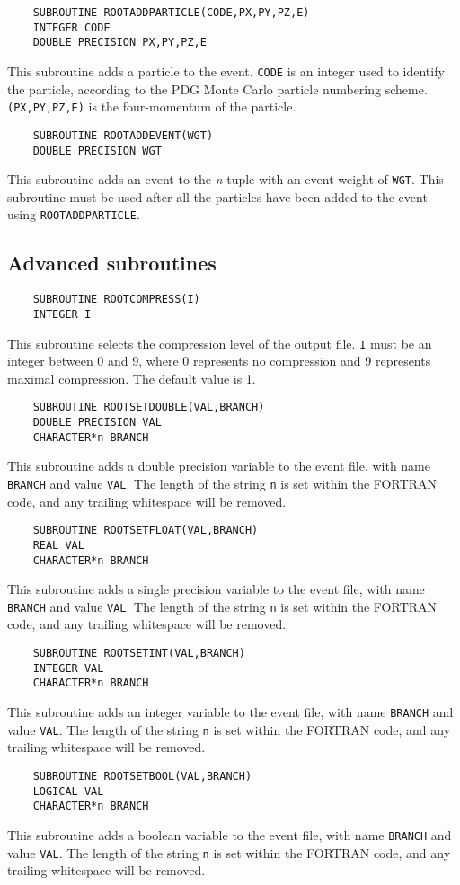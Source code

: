 \documentclass[a4paper,12pt]{article}
\begin{document}
\begin{verbatim}
    SUBROUTINE ROOTADDPARTICLE(CODE,PX,PY,PZ,E)
    INTEGER CODE
    DOUBLE PRECISION PX,PY,PZ,E\end{verbatim}
This subroutine adds a particle to the event. \verb|CODE| is an integer used to identify the particle, according to the PDG Monte Carlo particle numbering scheme. \verb|(PX,PY,PZ,E)| is the four-momentum of the particle.

\begin{verbatim}
    SUBROUTINE ROOTADDEVENT(WGT)
    DOUBLE PRECISION WGT\end{verbatim}
This subroutine adds an event to the \emph{n}-tuple with an event weight of \verb|WGT|. This subroutine must be used after all the particles have been added to the event using \verb|ROOTADDPARTICLE|.

\subsection{Advanced subroutines}
\begin{verbatim}
    SUBROUTINE ROOTCOMPRESS(I)
    INTEGER I\end{verbatim}
This subroutine selects the compression level of the output file. \verb|I| must be an integer between 0 and 9, where 0 represents no compression and 9 represents maximal compression. The default value is 1.

\begin{verbatim}
    SUBROUTINE ROOTSETDOUBLE(VAL,BRANCH)
    DOUBLE PRECISION VAL
    CHARACTER*n BRANCH\end{verbatim}
This subroutine adds a double precision variable to the event file, with name \verb|BRANCH| and value \verb|VAL|. The length of the string \verb|n| is set within the FORTRAN code, and any trailing whitespace will be removed.

\begin{verbatim}
    SUBROUTINE ROOTSETFLOAT(VAL,BRANCH)
    REAL VAL
    CHARACTER*n BRANCH\end{verbatim}
This subroutine adds a single precision variable to the event file, with name \verb|BRANCH| and value \verb|VAL|. The length of the string \verb|n| is set within the FORTRAN code, and any trailing whitespace will be removed.

\begin{verbatim}
    SUBROUTINE ROOTSETINT(VAL,BRANCH)
    INTEGER VAL
    CHARACTER*n BRANCH\end{verbatim}
This subroutine adds an integer variable to the event file, with name \verb|BRANCH| and value \verb|VAL|. The length of the string \verb|n| is set within the FORTRAN code, and any trailing whitespace will be removed.

\begin{verbatim}
    SUBROUTINE ROOTSETBOOL(VAL,BRANCH)
    LOGICAL VAL
    CHARACTER*n BRANCH\end{verbatim}
This subroutine adds a boolean variable to the event file, with name \verb|BRANCH| and value \verb|VAL|. The length of the string \verb|n| is set within the FORTRAN code, and any trailing whitespace will be removed.
\end{document}
